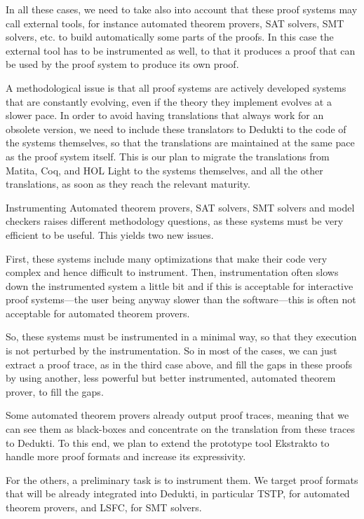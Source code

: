 In all these cases, we need to take also into account that these proof
systems may call external tools, for instance automated theorem
provers, SAT solvers, SMT solvers, etc. to build automatically some
parts of the proofs. In this case the external tool has to be
instrumented as well, to that it produces a proof that can be used by
the proof system to produce its own proof.

A methodological issue is that all proof systems are actively
developed systems that are constantly evolving, even if the theory
they implement evolves at a slower pace. In order to avoid having
translations that always work for an obsolete version, we need to
include these translators to Dedukti to the code of the systems
themselves, so that the translations are maintained at the same pace
as the proof system itself. This is our plan to migrate the
translations from Matita, Coq, and HOL Light to the systems
themselves, and all the other translations, as soon as they reach the
relevant maturity.


Instrumenting Automated theorem provers, SAT solvers, SMT solvers and
model checkers raises different methodology questions, as these systems
must be very efficient to be useful. This yields two new issues.

First, these systems include many optimizations that make their code
very complex and hence difficult to instrument. Then, instrumentation
often slows down the instrumented system a little bit and if this is
acceptable for interactive proof systems---the user being anyway
slower than the software---this is often not acceptable for automated
theorem provers.

So, these systems must be instrumented in a minimal way, so that they
execution is not perturbed by the instrumentation. So in most of the
cases, we can just extract a proof trace, as in the third case above,
and fill the gaps in these proofs by using another, less powerful but better
instrumented, automated theorem prover, to fill the gaps. 

Some automated theorem provers already output proof traces, meaning
that we can see them as black-boxes and concentrate on the translation
from these traces to Dedukti. To this end, we plan to extend the
prototype tool Ekstrakto to handle more proof formats and increase its
expressivity.

For the others, a preliminary task is to instrument them.  We target
proof formats that will be already integrated into Dedukti, in
particular TSTP, for automated theorem provers, and LSFC, for SMT solvers.

